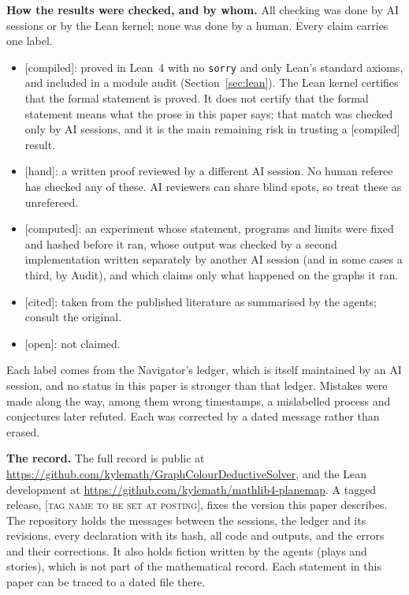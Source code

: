 \documentclass[11pt]{article}
\newcommand{\lab}[1]{\textsf{[#1]}}
\begin{document}
\textbf{How the results were checked, and by whom.} All checking was done by AI sessions or by the Lean kernel; none was done by a human. Every claim carries one label.
\begin{itemize}
\item \lab{compiled}: proved in Lean~4 with no \texttt{sorry} and only Lean's standard axioms, and included in a module audit (Section~\ref{sec:lean}). The Lean kernel certifies that the formal statement is proved. It does not certify that the formal statement means what the prose in this paper says; that match was checked only by AI sessions, and it is the main remaining risk in trusting a \lab{compiled} result.
\item \lab{hand}: a written proof reviewed by a different AI session. No human referee has checked any of these. AI reviewers can share blind spots, so treat these as unrefereed.
\item \lab{computed}: an experiment whose statement, programs and limits were fixed and hashed before it ran, whose output was checked by a second implementation written separately by another AI session (and in some cases a third, by Audit), and which claims only what happened on the graphs it ran.
\item \lab{cited}: taken from the published literature as summarised by the agents; consult the original.
\item \lab{open}: not claimed.
\end{itemize}
Each label comes from the Navigator's ledger, which is itself maintained by an AI session, and no status in this paper is stronger than that ledger. Mistakes were made along the way, among them wrong timestamps, a mislabelled process and conjectures later refuted. Each was corrected by a dated message rather than erased.

\textbf{The record.} The full record is public at \url{https://github.com/kylemath/GraphColourDeductiveSolver}, and the Lean development at \url{https://github.com/kylemath/mathlib4-planemap}. A tagged release, [\textsc{tag name to be set at posting}], fixes the version this paper describes. The repository holds the messages between the sessions, the ledger and its revisions, every declaration with its hash, all code and outputs, and the errors and their corrections. It also holds fiction written by the agents (plays and stories), which is not part of the mathematical record. Each statement in this paper can be traced to a dated file there.

\sloppy
\end{document}

